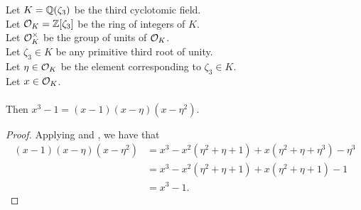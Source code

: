 \begin{lemma}
    \label{lmm:cube_sub_one}
    \leanok
    Let $K = \mathbb{Q}(\zeta_3)$ be the third cyclotomic field. \\
    Let $\mathcal{O}_K = \mathbb{Z}[\zeta_3]$ be the ring of integers of $K$. \\
    Let $\mathcal{O}^\times_K$ be the group of units of $\mathcal{O}_K$. \\
    Let $\zeta_3 \in K$ be any primitive third root of unity. \\
    Let $\eta \in \mathcal{O}_K$ be the element corresponding to $\zeta_3 \in K$. \\
    Let $x \in \mathcal{O}_K$. \\\\
    Then $x^3 - 1 = (x - 1)(x - \eta)(x - \eta^ 2)$.
\end{lemma}
\begin{proof}
    \leanok
    Applying  and , we have that
    \begin{align*}
        (x - 1)(x - \eta)(x - \eta^ 2)
        &= x^3 - x^2 (\eta^2 + \eta + 1) + x (\eta^2 + \eta + \eta^3) - \eta^3 \\
        &= x^3 - x^2 (\eta^2 + \eta + 1) + x (\eta^2 + \eta + 1) - 1 \\
        &= x^3 - 1.
    \end{align*}
\end{proof}

